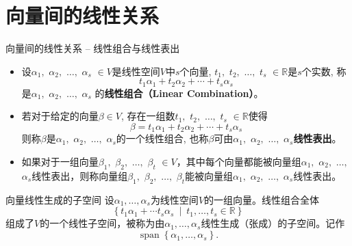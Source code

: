 
\section{向量间的线性关系}


\begin{frame}

\begin{block}{向量间的线性关系 -- 线性组合与线性表出}
\begin{itemize}
\item<1-> 设$\alpha_1,$ $\alpha_2,$ $\ldots,$ $\alpha_s$ $\in V$是线性空间$V$中$s$个向量, $t_1,$ $t_2,$ $\dots,$ $t_s$ $\in \mathbb{R}$是$s$个实数, 称
\[t_1 \alpha_1 + t_2 \alpha_2 + \cdots + t_s \alpha_s\]
是$\alpha_1,$ $\alpha_2,$ $\ldots,$ $\alpha_s$ 的{\bfseries 线性组合（Linear Combination）}。
\item<2-> 若对于给定的向量$\beta \in V$, 存在一组数$t_1,$ $t_2,$ $\ldots,$ $t_s$ $\in \mathbb{R}$使得
\[\beta = t_1 \alpha_1 + t_2 \alpha_2 + \cdots + t_s \alpha_s\]
则称$\beta$是$\alpha_1,$ $\alpha_2,$ $\ldots,$ $\alpha_s$的一个线性组合, 也称$\beta$可由$\alpha_1,$ $\alpha_2,$ $\ldots,$ $\alpha_s${\bfseries 线性表出}。
\item<3-> 如果对于一组向量$\beta_1,$ $\beta_2,$ $\ldots,$ $\beta_t$ $\in V$，其中每个向量都能被向量组$\alpha_1,$ $\alpha_2,$ $\ldots,$ $\alpha_s$线性表出，则称向量组$\beta_1,$ $\beta_2,$ $\ldots,$ $\beta_t$能被向量组$\alpha_1,$ $\alpha_2,$ $\ldots,$ $\alpha_s$线性表出。
\end{itemize}
\end{block}

\end{frame}


\begin{frame}

\begin{block}{向量线性生成的子空间}
设$\alpha_1,\ldots,\alpha_s$为线性空间$V$的一组向量。线性组合全体
\[\left\{ t_1\alpha_1 + \cdots t_s\alpha_s \ \middle|\ t_1,\ldots,t_s\in\mathbb{R} \right\}\]
组成了$V$的一个线性子空间，被称为由$\alpha_1,\ldots,\alpha_s$线性生成（张成）的子空间。记作
\[\operatorname{span}\left\{\alpha_1, \ldots, \alpha_s\right\}.\]
\end{block}

\end{frame}

